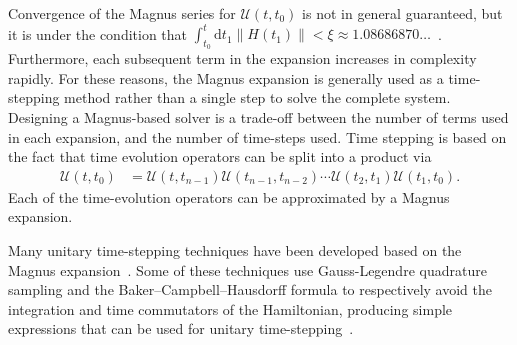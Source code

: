 \documentclass{jors}
\begin{document}
		Convergence of the Magnus series for $ \mathcal{U}(t, t_0) $ is not in general guaranteed, but it is under the condition that $ \int_{t_0}^t\mathrm{d}t_1\|H(t_1)\| < \xi \approx 1.08686870\dots $~\cite{blanes_magnus_2009}.
		Furthermore, each subsequent term in the expansion increases in complexity rapidly.
		For these reasons, the Magnus expansion is generally used as a time-stepping method rather than a single step to solve the complete system.
		Designing a Magnus-based solver is a trade-off between the number of terms used in each expansion, and the number of time-steps used.
		Time stepping is based on the fact that time evolution operators can be split into a product via
		\begin{align}
			\mathcal{U}(t, t_0) &= \mathcal{U}(t, t_{n - 1})\mathcal{U}(t_{n - 1}, t_{n - 2})\cdots\mathcal{U}(t_2, t_1)\mathcal{U}(t_1, t_0).\label{eq:product_of_time_evolution}
		\end{align}
		Each of the time-evolution operators can be approximated by a Magnus expansion.


		Many unitary time-stepping techniques have been developed based on the Magnus expansion~\cite{auer_magnus_2018}.
		Some of these techniques use Gauss-Legendre quadrature sampling and the Baker–Campbell–Hausdorff formula to respectively avoid the integration and time commutators of the Hamiltonian, producing simple expressions that can be used for unitary time-stepping~\cite{blanes_fourth-_2006}.
		
\end{document}
